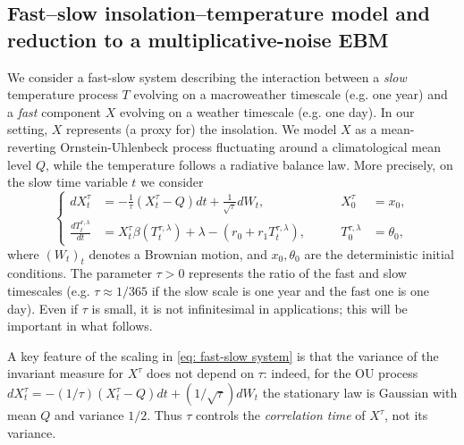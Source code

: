 \documentclass[10pt]{amsart}
\numberwithin{equation}{section}
\begin{document}
\subsection{Fast–slow insolation–temperature model and reduction to a multiplicative-noise EBM}
\label{subsec: fast slow model}
We consider a fast-slow system describing the interaction between a \emph{slow} temperature process $T$ evolving on a macroweather timescale (e.g. one year) and a \emph{fast} component $X$ evolving on a weather timescale (e.g. one day). In our setting, $X$ represents (a proxy for) the insolation. We model $X$ as a mean-reverting Ornstein-Uhlenbeck process fluctuating around a climatological mean level $Q$, while the temperature follows a radiative balance law. More precisely, on the slow time variable $t$ we consider
\begin{equation}
\left \lbrace 
\begin{aligned}
        dX_t^\tau  & = - \frac{1}{\tau } (X_t^\tau- Q) dt + \frac{1}{\sqrt{\tau }}dW_t, \qquad &X_0^\tau &= x_0,\\
    \frac{dT^{\tau,\lambda}_t }{dt} &=  X_t^\tau \beta(T^{\tau,\lambda}_t) + \lambda - (r_0 + r_1 T^{\tau,\lambda}_t) ,  \qquad &T_0^{\tau,\lambda} & = \theta_0,
\end{aligned}
\right.
    \label{eq: fast-slow system}
\end{equation}
where $(W_t)_t$ denotes a Brownian motion, and $x_0, \theta_0$ are the deterministic initial conditions. The parameter $\tau >0$ represents the ratio of the fast and slow timescales (e.g. $\tau \approx 1 /365$ if the slow scale is one year and the fast one is one day). Even if $\tau$ is small, it is not infinitesimal in applications; this will be important in what follows. 


A key feature of the scaling in \eqref{eq: fast-slow system} is that the variance of the invariant measure for $X^\tau$ does not depend on $\tau$: indeed, for the OU process $dX_t^\tau = -(1/\tau) (X_t ^\tau- Q)dt + (1/\sqrt{\tau }) dW_t$ the stationary law is Gaussian with mean $Q$ and variance $1/2.$ Thus $\tau$ controls the \emph{correlation time} of $X^\tau$, not its variance.
\end{document}

